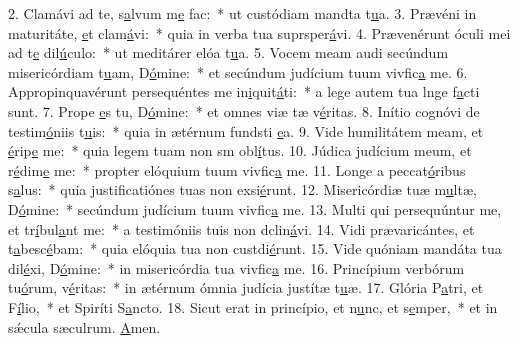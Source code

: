 2. Clamávi ad te, s\uline{a}lvum m\uline{e} fac:~* ut custódiam mandta t\uline{u}a.
3. Prævéni in maturitáte, \uline{e}t clam\uline{á}vi:~* quia in verba tua suprsper\uline{á}vi.
4. Prævenérunt óculi mei ad t\uline{e} dil\uline{ú}culo:~* ut meditárer elóa t\uline{u}a.
5. Vocem meam audi secúndum misericórdiam t\uline{u}am, D\uline{ó}mine:~* et secúndum judícium tuum vivfic\uline{a} me.
6. Appropinquavérunt persequéntes me in\uline{i}quit\uline{á}ti:~* a lege autem tua lnge f\uline{a}cti sunt.
7. Prope \uline{e}s tu, D\uline{ó}mine:~* et omnes viæ tæ v\uline{é}ritas.
8. Inítio cognóvi de testim\uline{ó}niis t\uline{u}is:~* quia in ætérnum fundsti \uline{e}a.
9. Vide humilitátem meam, et \uline{é}rip\uline{e} me:~* quia legem tuam non sm obl\uline{í}tus.
10. Júdica judícium meum, et r\uline{é}dim\uline{e} me:~* propter elóquium tuum vivfic\uline{a} me.
11. Longe a peccat\uline{ó}ribus s\uline{a}lus:~* quia justificatiónes tuas non exsi\uline{é}runt.
12. Misericórdiæ tuæ m\uline{u}ltæ, D\uline{ó}mine:~* secúndum judícium tuum vivfic\uline{a} me.
13. Multi qui persequúntur me, et tr\uline{í}bul\uline{a}nt me:~* a testimóniis tuis non dclin\uline{á}vi.
14. Vidi prævaricántes, et t\uline{a}besc\uline{é}bam:~* quia elóquia tua non custdi\uline{é}runt.
15. Vide quóniam mandáta tua dil\uline{é}xi, D\uline{ó}mine:~* in misericórdia tua vivfic\uline{a} me.
16. Princípium verbórum tu\uline{ó}rum, v\uline{é}ritas:~* in ætérnum ómnia judícia justítæ t\uline{u}æ.
17. Glória P\uline{a}tri, et F\uline{í}lio,~* et Spiríti S\uline{a}ncto.
18. Sicut erat in princípio, et n\uline{u}nc, et s\uline{e}mper,~* et in sǽcula sæculrum. \uline{A}men.
